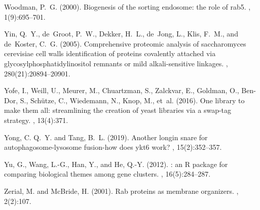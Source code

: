 \documentclass[12pt,english]{article}
\begin{document}
\begin{thebibliography}{}
Woodman, P.~G. (2000).
\newblock Biogenesis of the sorting endosome: the role of rab5.
, 1(9):695--701.

Yin, Q.~Y., de~Groot, P.~W., Dekker, H.~L., de~Jong, L., Klis, F.~M., and
  de~Koster, C.~G. (2005).
\newblock Comprehensive proteomic analysis of saccharomyces cerevisiae cell
  walls identification of proteins covalently attached via
  glycosylphosphatidylinositol remnants or mild alkali-sensitive linkages.
, 280(21):20894--20901.

Yofe, I., Weill, U., Meurer, M., Chuartzman, S., Zalckvar, E., Goldman, O.,
  Ben-Dor, S., Sch{\"u}tze, C., Wiedemann, N., Knop, M., et~al. (2016).
\newblock One library to make them all: streamlining the creation of yeast
  libraries via a swap-tag strategy.
, 13(4):371.

Yong, C. Q.~Y. and Tang, B.~L. (2019).
\newblock Another longin snare for autophagosome-lysosome fusion-how does ykt6
  work?
, 15(2):352--357.

Yu, G., Wang, L.-G., Han, Y., and He, Q.-Y. (2012).
: an {R} package for comparing biological themes
  among gene clusters.
, 16(5):284--287.

Zerial, M. and McBride, H. (2001).
\newblock Rab proteins as membrane organizers.
, 2(2):107.

\end{thebibliography}


\end{document}
